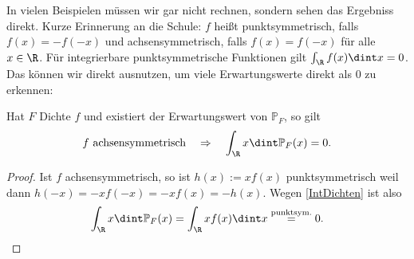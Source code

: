 In vielen Beispielen m\"ussen wir gar nicht rechnen, sondern sehen das Ergebniss direkt. Kurze Erinnerung an die Schule: $f$ hei\ss t punktsymmetrisch, falls $f(x)=-f(-x)$ und achsensymmetrisch, falls $f(x)=f(-x)$ f\"ur alle $x\in \R$. F\"ur integrierbare punktsymmetrische Funktionen gilt $\int_\R f(x)\dint x=0$. Das k\"onnen wir direkt ausnutzen, um viele Erwartungswerte direkt als $0$ zu erkennen:
\begin{lemma}\label{ky}
	Hat $F$ Dichte $f$ und existiert der Erwartungswert von $\mathbb{P}_F$, so gilt
	\[ f \text{ achsensymmetrisch} \quad \Rightarrow \quad \int_\R x \dint \mathbb P_F(x)= 0. \]
\end{lemma}
\begin{proof}
	Ist $f$ achsensymmetrisch, so ist $h(x) := xf(x)$ punktsymmetrisch weil dann $h(-x) = -xf(-x) = -xf(x) = -h(x)$. Wegen \ref{IntDichten} ist also \[ \int_{\R} x \dint \mathbb{P}_F(x) = \int_{\R} x f(x) \dint x \overset{\text{punktsym.}}{=} 0. \]	
\end{proof}

